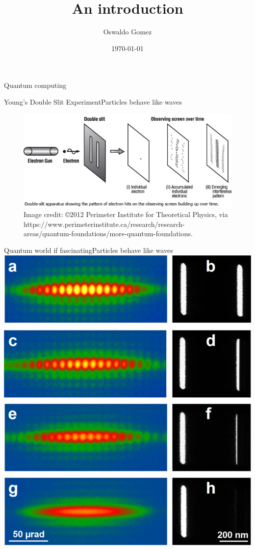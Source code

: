\documentclass{beamer}
\title[Quantum Computing]{An introduction}
\author{Oswaldo Gomez}
\institute{AI Engineering}
\date{\today}
\begin{document}
\begin{frame}{Quantum computing}
	\titlepage
\end{frame}

\begin{frame}{Young's Double Slit Experiment}{Particles behave like waves}
	\center
	\begin{figure}
		\includegraphics[keepaspectratio=true,width=.8\paperwidth]{.attachments/double-slit.jpeg}
		\caption{Image credit: ©2012 Perimeter Institute for Theoretical Physics, via https://www.perimeterinstitute.ca/research/research-areas/quantum-foundations/more-quantum-foundations.}
	\end{figure}
\end{frame}

\begin{frame}{Quantum world if fascinating}{Particles behave like waves}
	\center
	\includegraphics[keepaspectratio=true,width=.5\paperwidth]{.attachments/young.png}
\end{frame}
\end{document}
